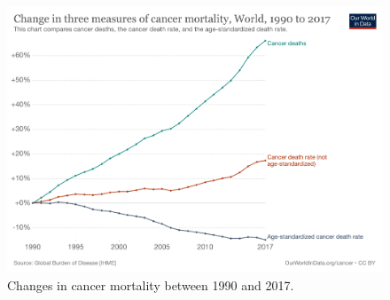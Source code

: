 \begin{figure}[!htb]
    \centering\includegraphics[width=1.0\textwidth,height=0.3\textheight,keepaspectratio]{Images/cancer-deaths-rate-and-age-standardized-rate-index.png}
      \caption{Changes in cancer mortality between 1990 and 2017. \cite{World_in_Data_undated-gc}}
      \label{fig:cancer_death}
  \end{figure}
  \FloatBarrier







